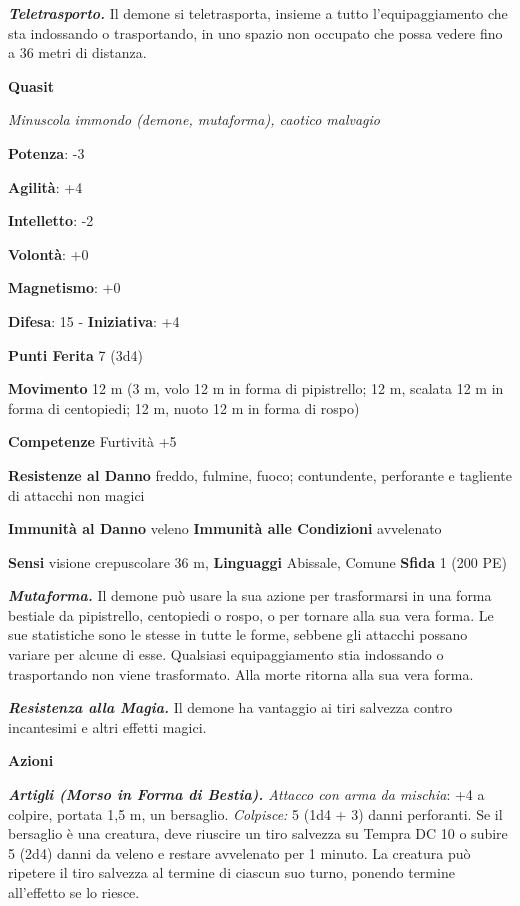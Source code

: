 \begin{multicols}{2}
\emph{\textbf{Teletrasporto.}} Il demone si teletrasporta, insieme a
tutto l'equipaggiamento che sta indossando o trasportando, in uno spazio
non occupato che possa vedere fino a 36 metri di distanza.



\textbf{Quasit}

\emph{Minuscola immondo (demone, mutaforma), caotico malvagio}

\textbf{Potenza}: -3

\textbf{Agilità}: +4

\textbf{Intelletto}: -2

\textbf{Volontà}: +0

\textbf{Magnetismo}: +0

\textbf{Difesa}: 15 - \textbf{Iniziativa}: +4

\textbf{Punti Ferita} 7 (3d4)

\textbf{Movimento} 12 m (3 m, volo 12 m in forma di pipistrello; 12 m,
scalata 12 m in forma di centopiedi; 12 m, nuoto 12 m in forma di rospo)

\textbf{Competenze} Furtività +5

\textbf{Resistenze al Danno} freddo, fulmine, fuoco; contundente,
perforante e tagliente di attacchi non magici

\textbf{Immunità al Danno} veleno \textbf{Immunità alle Condizioni}
avvelenato

\textbf{Sensi} visione crepuscolare 36 m, 
\textbf{Linguaggi} Abissale, Comune \textbf{Sfida} 1 (200 PE)

\emph{\textbf{Mutaforma.}} Il demone può usare la sua azione per
trasformarsi in una forma bestiale da pipistrello, centopiedi o rospo, o
per tornare alla sua vera forma. Le sue statistiche sono le stesse in
tutte le forme, sebbene gli attacchi possano variare per alcune di esse.
Qualsiasi equipaggiamento stia indossando o trasportando non viene
trasformato. Alla morte ritorna alla sua vera forma.

\emph{\textbf{Resistenza alla Magia.}} Il demone ha vantaggio ai tiri
salvezza contro incantesimi e altri effetti magici.

\textbf{Azioni}

\emph{\textbf{Artigli (Morso in Forma di Bestia).} Attacco con arma da
mischia}: +4 a colpire, portata 1,5 m, un bersaglio. \emph{Colpisce:} 5
(1d4 + 3) danni perforanti. Se il bersaglio è una creatura, deve
riuscire un tiro salvezza su Tempra DC 10 o subire 5 (2d4) danni
da veleno e restare avvelenato per 1 minuto. La creatura può ripetere il
tiro salvezza al termine di ciascun suo turno, ponendo termine
all'effetto se lo riesce.


\end{multicols}
